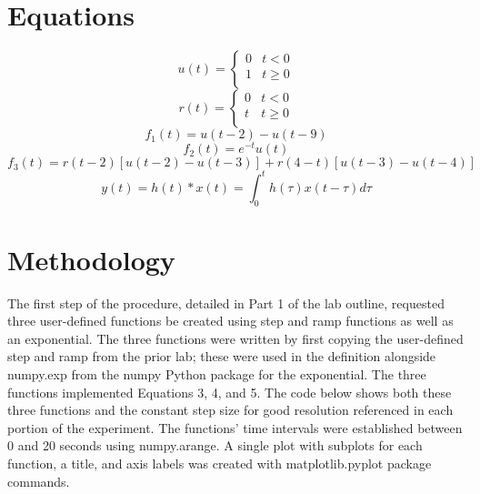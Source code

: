 \documentclass[12pt]{report}
\begin{document}
\section{Equations}
	
\begin{equation}
	u(t)=
	\begin{cases}
		0 & t < 0\\
		1 & t\ge 0\\
	\end{cases}
\end{equation}
\begin{equation}
	r(t)=
	\begin{cases}
		0 & t < 0\\
		t & t\ge 0\\
	\end{cases}
\end{equation}
\begin{equation}
	f_1(t)= u(t - 2) - u(t - 9)
\end{equation}
\begin{equation}
	f_2(t)= e^{-t} u(t)
\end{equation}
\begin{equation}
	f_3(t)= r(t - 2)[u(t - 2) - u(t - 3)] + r(4 - t)[u(t - 3) - u(t - 4)]
\end{equation}
\begin{equation}
	y(t)= h(t) * x(t) = \int_{0}^{t}h(\tau)x(t - \tau)d\tau
\end{equation}

\section{Methodology}
	
The first step of the procedure, detailed in Part 1 of the lab outline, requested three user-defined functions be created using step and ramp functions as well as an exponential. The three functions were written by first copying the user-defined step and ramp from the prior lab; these were used in the definition alongside numpy.exp from the numpy Python package for the exponential. The three functions implemented Equations 3, 4, and 5. The code below shows both these three functions and the constant step size for good resolution referenced in each portion of the experiment. The functions' time intervals were established between 0 and 20 seconds using numpy.arange. A single plot with subplots for each function, a title, and axis labels was created with matplotlib.pyplot package commands. \\
	
\end{document}
